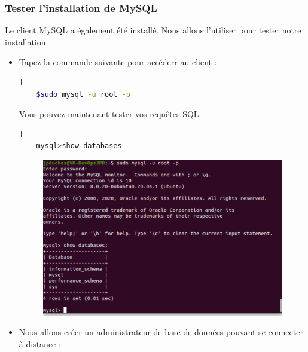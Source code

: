	\subsubsection{Tester l'installation de MySQL}
	
	Le client MySQL a également été installé. Nous allons l'utiliser pour tester notre installation.
	
	\begin{itemize}
		\item Tapez la commande suivante pour accéderr au client : 

	\begin{lstlisting}[language=bash]   ]
	$sudo mysql -u root -p
	\end{lstlisting}
	
	Vous pouvez maintenant tester vos requêtes SQL.
	\begin{lstlisting}[language=bash]   ]
	mysql>show databases
	\end{lstlisting}
	
	\begin{figure}[!htb]
		\centering
		\includegraphics[scale=0.45]{images/capture12}

	\end{figure}

	\item Nous allons créer un administrateur de base de données pouvant se connecter à distance :
	

\end{itemize}
